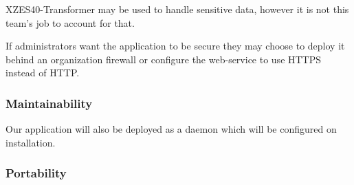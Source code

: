 XZES40-Transformer may be used to handle sensitive data, however it is not this team's job to account for that.

If administrators want the application to be secure they may choose to deploy it behind an organization firewall or configure the web-service to use HTTPS instead of HTTP.


\subsubsection{Maintainability}

Our application will also be deployed as a daemon which will be configured on installation.


\subsubsection{Portability}

